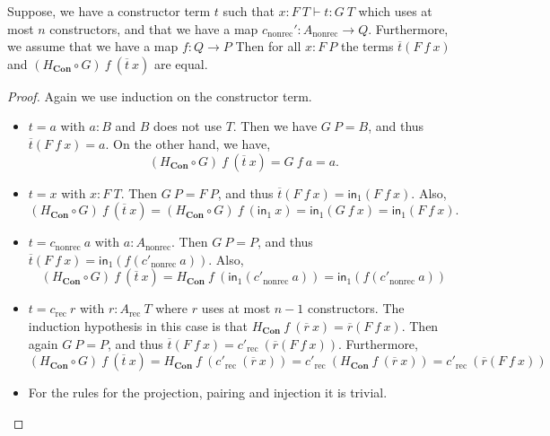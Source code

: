 \documentclass[a4paper,UKenglish]{lipics-v2016}
\newcommand{\Boperator}[1]{\mathsf{#1}}
\newcommand{\inn}{\Boperator{in}}
\newcommand{\rec}[0]{\operatorname{rec}}
\newcommand{\nonrec}[0]{\operatorname{nonrec}}
\newcommand{\Con}[0]{\textbf{Con}}
\begin{document}
\begin{lemma}
\label{lem:constrCoh}
Suppose, we have a constructor term $t$ such that $x : F \> T \vdash t : G \> T$ which uses at most $n$ constructors, and that we have a map $c_{\nonrec}' : A_{\nonrec} \rightarrow Q$.
Furthermore, we assume that we have a map $f : Q \rightarrow P$
Then for all $x : F \> P$ the terms $\overline{t}(F \> f \> x)$ and $(H_{\Con} \circ G) \> f \> (\overline{t} \> x)$ are equal.
\end{lemma}

\begin{proof}
Again we use induction on the constructor term.
\begin{itemize}
        \item $t = a$ with $a : B$ and $B$ does not use $T$. 
        Then we have $G \> P = B$, and thus 
        $
        \overline{t}(F \> f \> x) = a.
        $
        On the other hand, we have, 
        \[
        (H_{\Con} \circ G) \> f \> (\overline{t} \> x) = G \> f \> a = a.
        \]
        \item $t = x$ with $x : F \> T$. 
        Then $G \> P = F \> P$, and thus
        $
        \overline{t}(F \> f \> x) = \inn_1(F \> f \> x).
        $
        Also,
        \[
        (H_{\Con} \circ G) \> f \> (\overline{t} \> x) = (H_{\Con} \circ G) \> f \> (\inn_1 \> x) = \inn_1(G \> f \> x) = \inn_1(F \> f \> x).
        \]
        \item $t = c_{\nonrec} \> a$ with $a : A_{\nonrec}$. 
        Then $G \> P = P$, and thus
        $
        \overline{t}(F \> f \> x) = \inn_1(f(c'_{\nonrec} \> a))
        $.
        Also,
        \[
        (H_{\Con} \circ G) \> f \> (\overline{t} \> x) = H_{\Con} \> f \> (\inn_1(c'_{\nonrec} \> a)) = \inn_1(f(c'_{\nonrec} \> a))
        \]
        \item $t = c_{\rec} \> r$ with $r : A_{\rec} \> T$ where $r$ uses at most $n-1$ constructors. 
        The induction hypothesis in this case is that $H_{\Con} \> f \> (\overline{r} \> x) = \overline{r}(F \> f \> x)$.
        Then again $G \> P = P$, and thus
        $
        \overline{t}(F \> f \> x) = c'_{\rec} \> (\overline{r}(F \> f \> x))
        $.
        Furthermore,
        \[
        (H_{\Con} \circ G) \> f \> (\overline{t} \> x) = H_{\Con} \> f \> (c'_{\rec} \> (\overline{r} \> x)) = c'_{\rec} \> (H_{\Con} \> f \> (\overline{r} \> x)) = c'_{\rec} \> (\overline{r}(F \> f \> x))
        \]
        \item For the rules for the projection, pairing and injection it is trivial. \qedhere
\end{itemize}
\end{proof}
\end{document}
